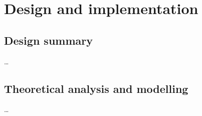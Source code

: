 
\section{Design and implementation}




\subsection{Design summary}

\ldots

\subsection{Theoretical analysis and modelling}


\ldots

\newpage


